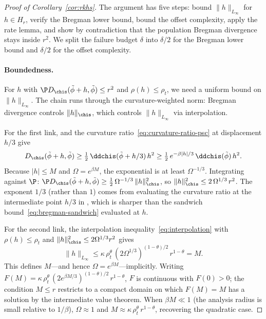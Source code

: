 \documentclass{article}
\begin{document}
\begin{proof}[Proof of Corollary~\ref{cor:rkhs}]
The argument has five steps:
bound $\|h\|_{L_\infty}$ for $h \in H_r$,
verify the Bregman lower bound,
bound the offset complexity,
apply the rate lemma,
and show by contradiction
that the population Bregman divergence stays inside $r^2$.
We split the failure budget $\delta$
into $\delta/2$ for the Bregman lower bound
and $\delta/2$ for the offset complexity.

\paragraph{Boundedness.}
For $h$ with
$\P D_{\chis}(\tilde\phi+h,\tilde\phi) \le r^2$
and $\rho(h) \le \rho_t$,
we need a uniform bound on $\|h\|_{L_\infty}$.
The chain runs through the curvature-weighted norm:
Bregman divergence controls $\|h\|_{\chis}$,
which controls $\|h\|_{L_\infty}$ via interpolation.

For the first link,
and the curvature ratio~\eqref{eq:curvature-ratio-psc}
at displacement $h/3$ give
\[
D_{\chis}(\tilde\phi+h,\tilde\phi)
  \ge \tfrac{1}{2}\,
    \ddchis(\tilde\phi + h/3)\, h^2
  \ge \tfrac{1}{2}\,
    e^{-\beta|h|/3}\, \ddchis(\tilde\phi)\, h^2.
\]
Because $|h| \le M$
and $\Omega = e^{\beta M}$,
the exponential is at least $\Omega^{-1/3}$.
Integrating against $\P$:
$\P D_{\chis}(\tilde\phi+h,\tilde\phi)
  \ge \frac{1}{2}\, \Omega^{-1/3}\, \|h\|_{\chis}^2$,
so
$\|h\|_{\chis}^2 \le 2\, \Omega^{1/3}\, r^2$.
The exponent $1/3$ (rather than $1$)
comes from evaluating the curvature ratio
at the intermediate point $h/3$
in ,
which is sharper than
the sandwich bound~\eqref{eq:bregman-sandwich}
evaluated at $h$.

For the second link,
the interpolation inequality~\eqref{eq:interpolation}
with $\rho(h) \le \rho_t$
and $\|h\|_{\chis}^2 \le 2\Omega^{1/3} r^2$ gives
\[
\|h\|_{L_\infty}
  \le \kappa\,
    \rho_t^\theta\,
    (2\Omega^{1/3})^{(1-\theta)/2}\,
    r^{1-\theta}
  = M.
\]
This defines $M$---and hence $\Omega = e^{\beta M}$---implicitly.
Writing $F(M) = \kappa\, \rho_t^\theta\,
  (2e^{\beta M/3})^{(1-\theta)/2}\, r^{1-\theta}$,
$F$ is continuous with $F(0) > 0$;
the condition $M \le r$ restricts
to a compact domain
on which $F(M) = M$ has a solution
by the intermediate value theorem.
When $\beta M \ll 1$
(the analysis radius is small
relative to $1/\beta$),
$\Omega \approx 1$
and $M \approx \kappa\,\rho_t^\theta\, r^{1-\theta}$,
recovering the quadratic case.


\end{proof}
\end{document}
